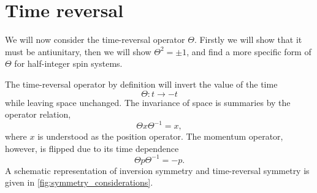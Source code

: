 \section{Time reversal}
We will now consider the time-reversal operator $\Theta $.
Firstly we will show that it must be antiunitary, then we will show $\Theta^2 = \pm 1$, and find a more specific form of $\Theta$ for half-integer spin systems.


The time-reversal operator by definition will invert the value of the time
$$
\Theta: t \rightarrow -t
$$
while leaving space unchanged.
The invariance of space is summaries by the operator relation,
\begin{equation}
  \label{eq:TRdef}
  \Theta x \Theta^{-1} = x,
\end{equation}
where $x$ is understood as the position operator.
The momentum operator, however, is flipped due to its time dependence
\begin{equation}
  \label{eq:Pdef}
  \Theta p \Theta^{-1} = - p.
\end{equation}
A schematic representation of inversion symmetry and time-reversal symmetry is given in \cref{fig:symmetry_considerations}.

